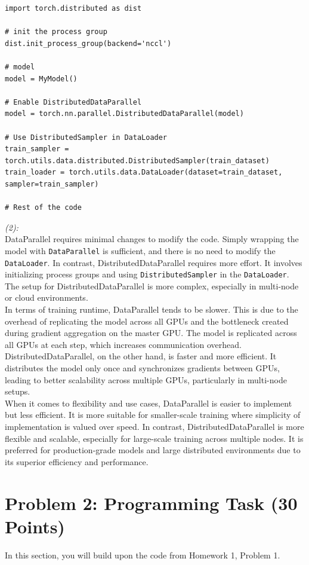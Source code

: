 \documentclass[11pt, oneside]{article}   	%
\begin{document}
\begin{verbatim}
import torch.distributed as dist

# init the process group
dist.init_process_group(backend='nccl')

# model
model = MyModel()

# Enable DistributedDataParallel
model = torch.nn.parallel.DistributedDataParallel(model)

# Use DistributedSampler in DataLoader
train_sampler = torch.utils.data.distributed.DistributedSampler(train_dataset)
train_loader = torch.utils.data.DataLoader(dataset=train_dataset, sampler=train_sampler)

# Rest of the code
\end{verbatim}

\textit{(2):} 
\\
DataParallel requires minimal changes to modify the code. Simply wrapping the model with \texttt{DataParallel} is sufficient, and there is no need to modify the \texttt{DataLoader}. In contrast, DistributedDataParallel requires more effort. It involves initializing process groups and using \texttt{DistributedSampler} in the \texttt{DataLoader}. The setup for DistributedDataParallel is more complex, especially in multi-node or cloud environments.
\\
In terms of training runtime, DataParallel tends to be slower. This is due to the overhead of replicating the model across all GPUs and the bottleneck created during gradient aggregation on the master GPU. The model is replicated across all GPUs at each step, which increases communication overhead. DistributedDataParallel, on the other hand, is faster and more efficient. It distributes the model only once and synchronizes gradients between GPUs, leading to better scalability across multiple GPUs, particularly in multi-node setups.
\\
When it comes to flexibility and use cases, DataParallel is easier to implement but less efficient. It is more suitable for smaller-scale training where simplicity of implementation is valued over speed. In contrast, DistributedDataParallel is more flexible and scalable, especially for large-scale training across multiple nodes. It is preferred for production-grade models and large distributed environments due to its superior efficiency and performance.

\newpage

\section*{Problem 2: Programming Task (30 Points)}
In this section, you will build upon the code from Homework 1, Problem 1.
\end{document}

